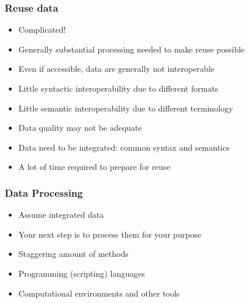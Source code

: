 \documentclass{beamer}
\begin{document}
{
	\begin{frame}[plain]
	\end{frame}
}

\begin{frame}
  \frametitle{Reuse data}
  
  \begin{itemize}
  \item Complicated!
  \item Generally substantial processing needed to make reuse possible
  \item Even if accessible, data are generally not interoperable
  \item Little syntactic interoperability due to different formats
  \item Little semantic interoperability due to different terminology
  \item Data quality may not be adequate
  \item Data need to be integrated: common syntax and semantics
  \item A lot of time required to prepare for reuse
  \end{itemize}
\end{frame}

\begin{frame}
  \frametitle{Data Processing}
  
  \begin{itemize}
  \item Assume integrated data
  \item Your next step is to process them for your purpose
  \item Staggering amount of methods
  \item Programming (scripting) languages
  \item Computational environments and other tools
  \end{itemize}
\end{frame}
\end{document}
